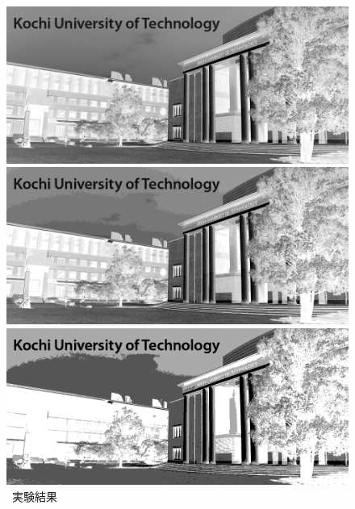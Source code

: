 \begin{figure}[h]
\begin{minipage}[b]{.23\textwidth}
    \end{minipage}
    \caption{\kadaiab\ 実験結果}
    \vsp
    \begin{minipage}[b]{.23\textwidth}
        \centering
        \includegraphics[keepaspectratio,width=\textwidth]{../../Figures/05_31_8.png}
    \end{minipage}
    \begin{minipage}[b]{.23\textwidth}
        \centering
        \includegraphics[keepaspectratio,width=\textwidth]{../../Figures/05_32_4.png}
    \end{minipage}
    \begin{minipage}[b]{.23\textwidth}
        \centering
        \includegraphics[keepaspectratio,width=\textwidth]{../../Figures/05_33_2.png}

\end{minipage}
\end{figure}
